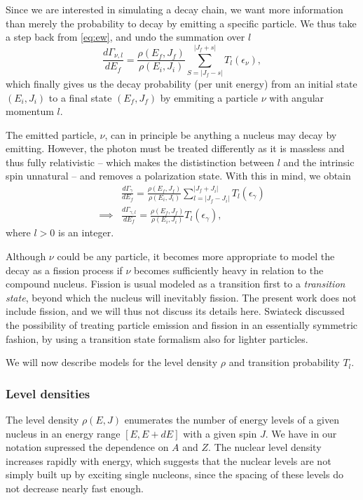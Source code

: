Since we are interested in simulating a decay chain, we want more information than merely the probability to decay by emitting a specific particle. We thus take a step back from \eqref{eq:ew}, and undo the summation over $l$
\begin{equation}
\frac{d\Gamma_{\nu,l}}{dE_f} = \frac{\rho(E_f,J_f)}{\rho(E_i,J_i)} \sum_{S=|J_f-s|}^{|J_f+s|} T_l(\epsilon_\nu),\label{eq:ew}
\end{equation}
which finally gives us the decay probability (per unit energy) from an initial state $(E_i,J_i)$ to a final state $(E_f,J_f)$ by emmiting a particle $\nu$ with angular momentum $l$.

The emitted particle, $\nu$, can in principle be anything a nucleus may decay by emitting. However, the photon must be treated differently as it is massless and thus fully relativistic -- which makes the dististinction between $l$ and the intrinsic spin unnatural -- and removes a polarization state. With this in mind, we obtain
\begin{align}
&\frac{d\Gamma_{\gamma}}{dE_f} = \frac{\rho(E_f,J_f)}{\rho(E_i,J_i)} \sum_{l=|J_f-J_i|}^{|J_f+J_i|} T_l(\epsilon_\gamma) \\
\implies & \frac{d\Gamma_{\gamma,l}}{dE_f} =\frac{\rho(E_f,J_f)}{\rho(E_i,J_i)} T_l(\epsilon_\gamma),\label{eq:gammagamma}
\end{align}
where $l>0$ is an integer.

Although $\nu$ could be any particle, it becomes more appropriate to model the decay as a fission process if $\nu$ becomes sufficiently heavy in relation to the compound nucleus. Fission is usual modeled as a transition first to a \emph{transition state}, beyond which the nucleus will inevitably fission\cite{krane:book}. The present work does not include fission, and we will thus not discuss its details here. Swiateck discussed the possibility of treating particle emission and fission in an essentially symmetric fashion, by using a transition state formalism also for lighter particles\cite{swiatecki:1983:art}. 

We will now describe models for the level density $\rho$ and transition probability $T_l$.

\subsubsection{Level densities}
The level density $\rho(E,J)$ enumerates the number of energy levels of a given nucleus in an energy range $[E,E+dE]$ with a given spin $J$. We have in our notation supressed the dependence on $A$ and $Z$. The nuclear level density increases rapidly with energy, which suggests that the nuclear levels are not simply built up by exciting single nucleons, since the spacing of these levels do not decrease nearly fast enough.

